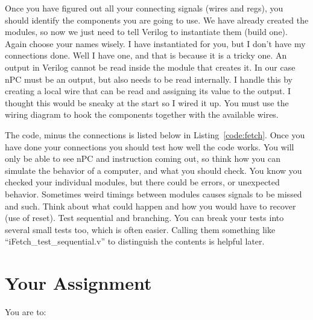 Once you have figured out all your connecting signals (wires and regs), you should identify the components you are going to use.  We have already created the modules, so now we just need to tell Verilog to instantiate them (build one).  Again choose your names wisely.  I have instantiated for you, but I don't have my connections done.  Well I have one, and that is because it is a tricky one.  An output in Verilog cannot be read inside the module that creates it.  In our case nPC must be an output, but also needs to be read internally.  I handle this by creating a local wire that can be read and assigning its value to the output.  I thought this would be sneaky at the start so I wired it up.  You must use the wiring diagram to hook the components together with the available wires.

The code, minus the connections is listed below in Listing~\ref{code:fetch}.  Once you have done your connections you should test how well the code works.  You will only be able to see nPC and instruction coming out, so think how you can simulate the behavior of a computer, and what you should check.  You know you checked your individual modules, but there could be errors, or unexpected behavior.  Sometimes weird timings between modules causes signals to be missed and such.  Think about what could happen and how you would have to recover (use of reset).  Test sequential and branching.  You can break your tests into several small tests too, which is often easier.  Calling them something like ``iFetch\_test\_sequential.v'' to distinguish the contents is helpful later.


\section{Your Assignment}
You are to:
